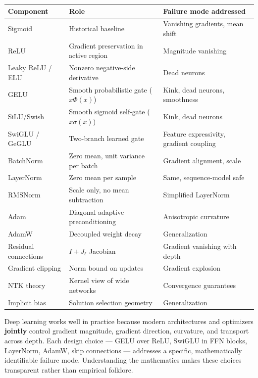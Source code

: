 \documentclass[12pt,a4paper]{article}
\theoremstyle{definition}
\theoremstyle{remark}
\begin{document}
\vspace{6pt}
\renewcommand{\arraystretch}{1.18}
\begin{center}
\begin{tabularx}{0.96\textwidth}{@{}>{\raggedright\arraybackslash}p{3.2cm}>{\raggedright\arraybackslash}X>{\raggedright\arraybackslash}p{3.9cm}@{}}
\toprule
\textbf{Component} & \textbf{Role} & \textbf{Failure mode addressed} \\
\midrule
Sigmoid     & Historical baseline & Vanishing gradients, mean shift \\
ReLU        & Gradient preservation in active region & Magnitude vanishing \\
Leaky ReLU / ELU & Nonzero negative-side derivative & Dead neurons \\
GELU        & Smooth probabilistic gate ($x\Phi(x)$) & Kink, dead neurons, smoothness \\
SiLU/Swish  & Smooth sigmoid self-gate ($x\sigma(x)$) & Kink, dead neurons \\
SwiGLU / GeGLU & Two-branch learned gate & Feature expressivity, gradient coupling \\
\midrule
BatchNorm   & Zero mean, unit variance per batch & Gradient alignment, scale \\
LayerNorm   & Zero mean per sample & Same, sequence-model safe \\
RMSNorm     & Scale only, no mean subtraction & Simplified LayerNorm \\
\midrule
Adam        & Diagonal adaptive preconditioning & Anisotropic curvature \\
AdamW       & Decoupled weight decay & Generalization \\
\midrule
Residual connections & $I + J_\ell$ Jacobian & Gradient vanishing with depth \\
Gradient clipping & Norm bound on updates & Gradient explosion \\
\midrule
NTK theory  & Kernel view of wide networks & Convergence guarantees \\
Implicit bias & Solution selection geometry & Generalization \\
\bottomrule
\end{tabularx}
\end{center}

\vspace{10pt}
\begin{keybox}
Deep learning works well in practice because modern architectures and optimizers \textbf{jointly} control gradient magnitude, gradient direction, curvature, and transport across depth. Each design choice — GELU over ReLU, SwiGLU in FFN blocks, LayerNorm, AdamW, skip connections — addresses a specific, mathematically identifiable failure mode. Understanding the mathematics makes these choices transparent rather than empirical folklore.
\end{keybox}
\end{document}
